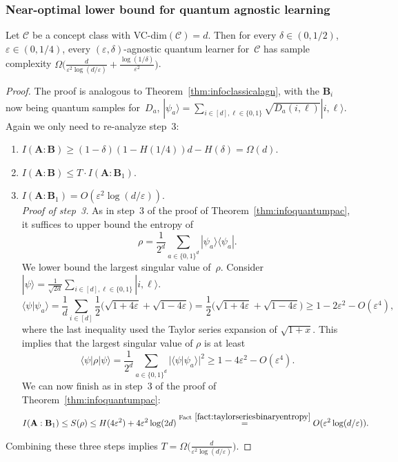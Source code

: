 \documentclass[twoside,11pt]{article}
\newcommand{\eps}{\varepsilon}
\newcommand{\ket}[1]{|#1\rangle}
\newcommand{\bra}[1]{\langle#1|}
\newcommand{\ip}[2]{\langle #1 | #2 \rangle}
\newcommand{\ketbra}[2]{|#1\rangle\! \langle #2|}
\def\01{\{0,1\}}
\newcommand{\C}{\ensuremath{\mathscr{C}}}
\begin{document}
\subsubsection{Near-optimal lower bound for quantum agnostic learning}

\begin{theorem}\label{thm:infoquantumagn}
	Let $\C$ be a concept class with VC-dim$(\C)=d$. Then for every $\delta\in (0,1/2)$, $\eps \in (0,1/4)$, every $(\eps,\delta)$-agnostic quantum learner for~$\C$ has sample complexity 
	$\Omega\Big(\frac{d}{\eps^2\log(d/\eps)}+\frac{\log(1/\delta)}{\eps^2}\Big)$.
\end{theorem}

\begin{proof}
	The proof is analogous to Theorem~\ref{thm:infoclassicalagn},
	with the $\mathbf{B}_i$ now being quantum samples for~$D_a$, 
	$\ket{\psi_a}=\sum_{i\in[d],\ell\in\01}\sqrt{D_a(i,\ell)}\ket{i,\ell}$.
	Again we only need to re-analyze step~3:
	\begin{enumerate}
		\item $I(\mathbf{A}:\mathbf{B})\geq (1-\delta)(1-H(1/4))d - H(\delta)=\Omega(d)$.
		\item $I(\mathbf{A}:\mathbf{B})\leq T\cdot I(\mathbf{A}:\mathbf{B}_1)$.
		\item $I(\mathbf{A}:\mathbf{B}_1)=O(\eps^2\log(d/\eps))$.\\[2mm]
		\emph{Proof of step~3.} As in step~3 of the proof of Theorem~\ref{thm:infoquantumpac}, it suffices to upper bound the entropy of
		$$
		\rho=\frac{1}{2^d}\sum_{a\in\01^d}\ketbra{\psi_a}{\psi_a}.
		$$
		We lower bound the largest singular value of~$\rho$.  Consider  $\ket{\psi}=\frac{1}{\sqrt{2d}}\sum_{i\in[d],\ell\in\01}\ket{i,\ell}$.
		$$
		\ip{\psi}{\psi_a}=\frac{1}{d}\sum_{i\in[d]}\frac{1}{2}\Big(\sqrt{1+4\eps}+\sqrt{1-4\eps}\Big)=\frac{1}{2}\Big(\sqrt{1+4\eps}+\sqrt{1-4\eps}\Big)\geq 1-2\eps^2-O(\eps^4),
		$$
		where the last inequality used the Taylor series expansion of $\sqrt{1+x}$.
		This implies that the largest singular value of $\rho$ is at least
		$$
		\bra{\psi}\rho\ket{\psi}=\frac{1}{2^d}\sum_{a\in\01^d}|\ip{\psi}{\psi_a}|^2\geq 1-4\eps^2-O(\eps^4).
		$$
		We can now finish as in step~3 of the proof of Theorem~\ref{thm:infoquantumpac}:
		\begin{align*}
		I(\mathbf{A}:\mathbf{B}_1)\leq S(\rho)\leq H(4\eps^2) + 4\eps^2\log(2d)\stackrel{\text{Fact}~\ref{fact:taylorseriesbinaryentropy}}{=}O(\eps^2\log(d/\eps)).
		\end{align*}
	\end{enumerate}
	Combining these three steps implies $T=\Omega\Big(\frac{d}{\eps^2\log(d/\eps)}\Big)$.
\end{proof}
\end{document}
